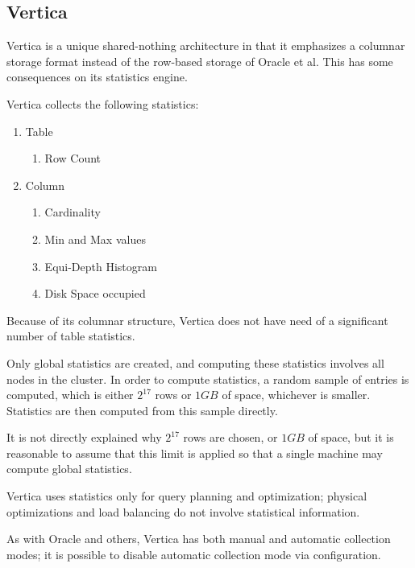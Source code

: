\subsection{Vertica}
Vertica is a unique shared-nothing architecture in that it emphasizes a columnar storage format instead of the row-based storage of Oracle et al. This has some consequences on its statistics engine.

Vertica collects the following statistics\cite{Vertica}:

\begin{enumerate}
				\item Table
								\begin{enumerate}
												\item	Row Count
								\end{enumerate}
				\item Column
								\begin{enumerate}
												\item	Cardinality
												\item Min and Max values
												\item Equi-Depth Histogram
												\item Disk Space occupied
								\end{enumerate}
\end{enumerate}

Because of its columnar structure, Vertica does not have need of a significant number of table statistics.

Only global statistics are created, and computing these statistics involves all nodes in the cluster. In order to compute statistics, a random sample of entries is computed, which is either $2^{17}$ rows or $1GB$ of space, whichever is smaller. Statistics are then computed from this sample directly\cite{Vertica}.

It is not directly explained why $2^{17}$ rows are chosen, or $1GB$ of space, but it is reasonable to assume that this limit is applied so that a single machine may compute global statistics.

Vertica uses statistics only for query planning and optimization; physical optimizations and load balancing do not involve statistical information. 

As with Oracle and others, Vertica has both manual and automatic collection modes; it is possible to disable automatic collection mode via configuration.

